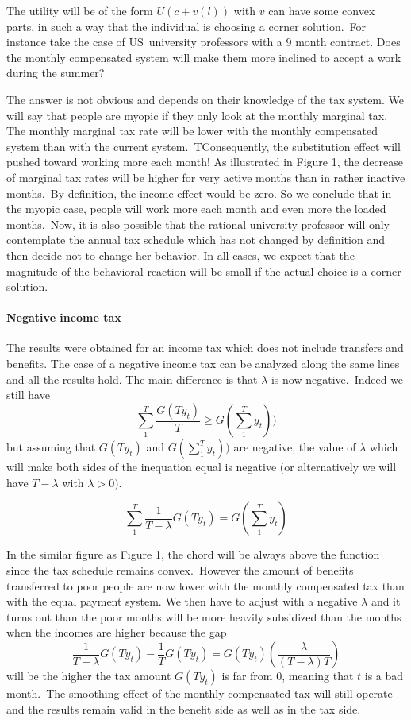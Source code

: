 The utility will be of the form $U(c+v(l))$ with $v$ can have some convex
parts, in such a way that the individual is choosing a corner solution.\ For
instance take the case of US\ university professors with a 9 month contract.
Does the monthly compensated system will make them more inclined to accept a
work during the summer?

The answer is not obvious and depends on their knowledge of the tax system. We
will say that people are myopic if they only look at the monthly marginal tax.
The monthly marginal tax rate will be lower with the monthly compensated
system than with the current system.\ TConsequently, the substitution effect
will pushed toward working more each month! As illustrated in Figure 1, the
decrease of marginal tax rates will be higher for very active months than in
rather inactive months.\ By definition, the income effect would be zero. So we
conclude that in the myopic case, people will work more each month and even
more the loaded months.\ Now, it is also possible that the rational university
professor will only contemplate the annual tax schedule which has not changed
by definition and then decide not to change her behavior. In all cases, we
expect that the magnitude of the behavioral reaction will be small if the
actual choice is a corner solution.

\paragraph{Negative income tax}

The results were obtained for an income tax which does not include transfers
and benefits. The case of a negative income tax can be analyzed along the same
lines and all the results hold. The main difference is that $\lambda$ is now
negative.\ Indeed we still have
\[
\sum_{1}^{T}\frac{G(Ty_{t})}{T}\geq G(\sum_{1}^{T}y_{t}))
\]
but assuming that $G(Ty_{t})$ and $G(\sum_{1}^{T}y_{t}))$ are negative, the
value of $\lambda$ which will make both sides of the inequation equal is
negative (or alternatively we will have $T-\lambda$ with $\lambda>0)$.%

\[
\sum_{1}^{T}\frac{1}{T-\lambda}G(Ty_{t})=G\left(  \sum_{1}^{T}y_{t}\right)
\]


In the similar figure as Figure 1, the chord will be always above the function
since the tax schedule remains convex.\ However the amount of benefits
transferred to poor people are now lower with the monthly compensated tax than
with the equal payment system. We then have to adjust with a negative
$\lambda$ and it turns out than the poor months will be more heavily
subsidized than the months when the incomes are higher because the gap
\[
\frac{1}{T-\lambda}G(Ty_{t})-\frac{1}{T}G(Ty_{t})=G(Ty_{t})(\frac{\lambda
}{\left(  T-\lambda\right)  T})
\]
will be the higher the tax amount $G(Ty_{t})$ is far from 0, meaning that $t$
is a bad month.\ The smoothing effect of the monthly compensated tax will
still operate and the results remain valid in the benefit side as well as in
the tax side.

